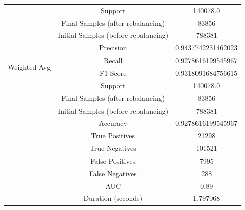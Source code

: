 \begin{longtable}{|c|c|c|}
 & Support & 140078.0 \\
 & Final Samples (after rebalancing) & 83856 \\
 & Initial Samples (before rebalancing) & 788381 \\
\hline
\multirow{4}{*}{Weighted Avg} & Precision & 0.9437742231462023 \\
 & Recall & 0.9278616199545967 \\
 & F1 Score & 0.9318091684756615 \\
 & Support & 140078.0 \\
 & Final Samples (after rebalancing) & 83856 \\
 & Initial Samples (before rebalancing) & 788381 \\
\hline
& Accuracy & 0.9278616199545967 \\ \hline
& True Positives & 21298 \\ \hline
& True Negatives & 101521 \\ \hline
& False Positives & 7995 \\ \hline
& False Negatives & 288 \\ \hline
& AUC & 0.89 \\ \hline
& Duration (seconds) & 1.797068 \\ \hline
\end{longtable}


